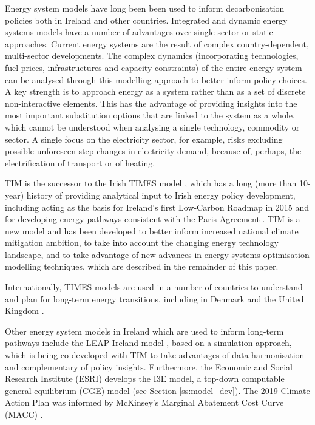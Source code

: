 \documentclass[journal abbreviation, manuscript]{copernicus}
\begin{document}
Energy system models have long been been used to inform decarbonisation policies both in Ireland and other countries. Integrated and dynamic energy systems models have a number of advantages over single-sector or static approaches. Current energy systems are the result of complex country-dependent, multi-sector developments. The complex dynamics (incorporating technologies, fuel prices, infrastructures and capacity constraints) of the entire energy system can be analysed through this modelling approach to better inform policy choices. A key strength is to approach energy as a system rather than as a set of discrete non-interactive elements. This has the advantage of providing insights into the most important substitution options that are linked to the system as a whole, which cannot be understood when analysing a single technology, commodity or sector. A single focus on the electricity sector, for example, risks excluding possible unforeseen step changes in electricity demand, because of, perhaps, the electrification of transport or of heating. 

TIM is the successor to the Irish TIMES model \cite{EnvironmentalProtectionAgency2020}, which has a long (more than 10-year) history of providing analytical input to Irish energy policy development, including acting as the basis for Ireland’s first Low-Carbon Roadmap in 2015 \cite{Deane2013} and for developing energy pathways consistent with the Paris Agreement \cite{Glynn2019}. TIM is a new model and has been developed to better inform increased national climate mitigation ambition, to take into account the changing energy technology landscape, and to take advantage of new advances in energy systems optimisation modelling techniques, which are described in the remainder of this paper.

Internationally, TIMES models are used in a number of countries to understand and plan for long-term energy transitions, including in Denmark \cite{Balyk2019} and the United Kingdom \cite{fais2016impact,daly2015indirect}. 

Other energy system models in Ireland which are used to inform long-term pathways include the LEAP-Ireland model \cite{MacUidhir2020,rogan2014leaps}, based on a simulation approach, which is being co-developed with TIM to take advantages of data harmonisation and complementary of policy insights. Furthermore, the Economic and Social Research Institute (ESRI) develops the I3E model, a top-down computable general equilibrium (CGE) model (see Section \ref{ss:model_dev}). The 2019 Climate Action Plan was informed by McKinsey's Marginal Abatement Cost Curve (MACC) \cite{DCCAE2019}. 
\end{document}
